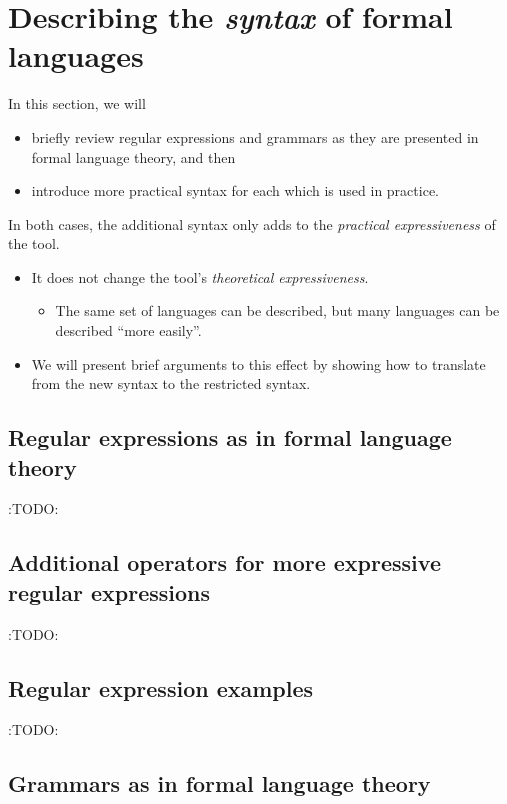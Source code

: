 \documentclass[11pt]{article}
\theoremstyle{definition}
\begin{document}
\section{Describing the \emph{syntax} of formal languages}
\label{sec:orgc7ac7aa}

In this section, we will
\begin{itemize}
\item briefly review regular expressions and grammars as
they are presented in formal language theory, and then
\item introduce more practical syntax for each
which is used in practice.
\end{itemize}

In both cases, the additional syntax only adds to
the \emph{practical expressiveness} of the tool.
\begin{itemize}
\item It does not change the tool's \emph{theoretical expressiveness}.
\begin{itemize}
\item The same set of languages can be described,
but many languages can be described “more easily”.
\end{itemize}
\item We will present brief arguments to this effect
by showing how to translate from the new syntax
to the restricted syntax.
\end{itemize}

\subsection{Regular expressions as in formal language theory}
\label{sec:orge3e252a}

:TODO:

\subsection{Additional operators for more expressive regular expressions}
\label{sec:org5d14c81}

:TODO:

\subsection{Regular expression examples}
\label{sec:org196b998}

:TODO:

\subsection{Grammars as in formal language theory}
\label{sec:org92e177e}
\end{document}
